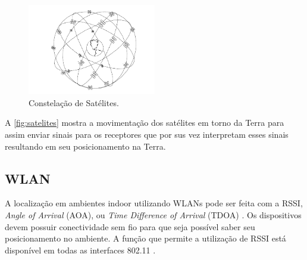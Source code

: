    \begin{figure}[H]
              \caption{\label{fig:satelites}{Constelação de Satélites.}}
              \centering
              \includegraphics[width=0.5\textwidth]{Figuras/gps_satelites.PNG}
        \end{figure}
        \par
        A  \autoref{fig:satelites} mostra a movimentação dos satélites em torno da Terra para assim enviar sinais para os receptores que por sus vez interpretam esses sinais resultando em seu posicionamento na Terra.
 
    \subsection{WLAN}
    \par
    A localização em ambientes indoor utilizando WLANs pode ser feita com a RSSI, \textit{Angle of Arrival} (AOA), ou \textit{Time Difference of Arrival} (TDOA) \cite{wifiFernandes}. Os dispositivos devem possuir conectividade sem fio para que seja possível saber seu posicionamento no ambiente. A função que permite a utilização de RSSI está disponível em todas as interfaces 802.11 \cite{Wlan2012}.
    

